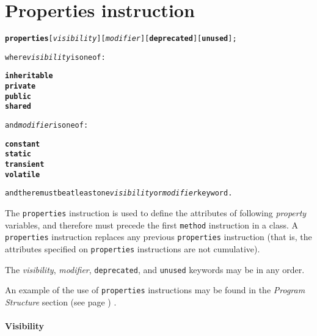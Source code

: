 \chapter{Properties instruction}\label{refprop}
\begin{shaded}
\begin{alltt}
\textbf{properties} [\emph{visibility}] [\emph{modifier}] [\textbf{deprecated}] [\textbf{unused}];

where \emph{visibility} is one of:

    \textbf{inheritable}
    \textbf{private}
    \textbf{public}
    \textbf{shared}

and \emph{modifier} is one of:

    \textbf{constant}
    \textbf{static}
    \textbf{transient}
    \textbf{volatile}

and there must be at least one \emph{visibility} or \emph{modifier} keyword.
\end{alltt}
\end{shaded}
 
The \texttt{properties} instruction is used to define the attributes
of following \emph{property} variables, and therefore must precede the
first \texttt{method} instruction in a class.
A \texttt{properties} instruction replaces any previous
\texttt{properties} instruction (that is, the attributes specified on
\texttt{properties} instructions are not cumulative).
 
The \emph{visibility}, \emph{modifier},
\texttt{deprecated}, and \texttt{unused} keywords may be in any
order.
 
An example of the use of \texttt{properties} instructions may be
found in the  \emph{Program Structure} section (see page \pageref{refpstruct}) .
\subsubsection{Visibility}
 
